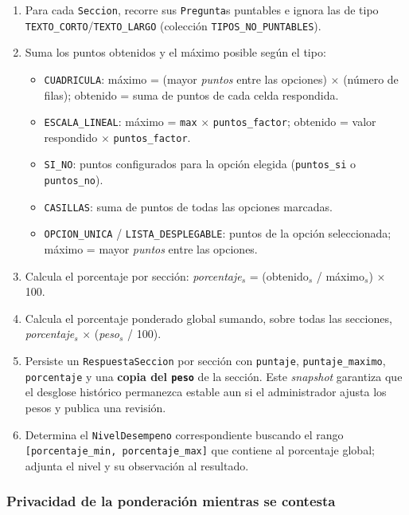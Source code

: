 \begin{enumerate}
    \item Para cada \texttt{Seccion}, recorre sus \texttt{Pregunta}s puntables e ignora las de tipo \texttt{TEXTO\_CORTO}/\texttt{TEXTO\_LARGO} (colección \texttt{TIPOS\_NO\_PUNTABLES}).
    \item Suma los puntos obtenidos y el máximo posible según el tipo:
    \begin{itemize}
        \item \texttt{CUADRICULA}: máximo = (mayor \emph{puntos} entre las opciones) $\times$ (número de filas); obtenido = suma de puntos de cada celda respondida.
        \item \texttt{ESCALA\_LINEAL}: máximo = \texttt{max} $\times$ \texttt{puntos\_factor}; obtenido = valor respondido $\times$ \texttt{puntos\_factor}.
        \item \texttt{SI\_NO}: puntos configurados para la opción elegida (\texttt{puntos\_si} o \texttt{puntos\_no}).
        \item \texttt{CASILLAS}: suma de puntos de todas las opciones marcadas.
        \item \texttt{OPCION\_UNICA} / \texttt{LISTA\_DESPLEGABLE}: puntos de la opción seleccionada; máximo = mayor \emph{puntos} entre las opciones.
    \end{itemize}
    \item Calcula el porcentaje por sección: \emph{porcentaje}$_s$ = (obtenido$_s$ / máximo$_s$) $\times$ 100.
    \item Calcula el porcentaje ponderado global sumando, sobre todas las secciones, \emph{porcentaje}$_s$ $\times$ (\emph{peso}$_s$ / 100).
    \item Persiste un \texttt{RespuestaSeccion} por sección con \texttt{puntaje}, \texttt{puntaje\_maximo}, \texttt{porcentaje} y una \textbf{copia del \texttt{peso}} de la sección. Este \emph{snapshot} garantiza que el desglose histórico permanezca estable aun si el administrador ajusta los pesos y publica una revisión.
    \item Determina el \texttt{NivelDesempeno} correspondiente buscando el rango \texttt{[porcentaje\_min, porcentaje\_max]} que contiene al porcentaje global; adjunta el nivel y su observación al resultado.
\end{enumerate}

\subsubsection{Privacidad de la ponderación mientras se contesta}

